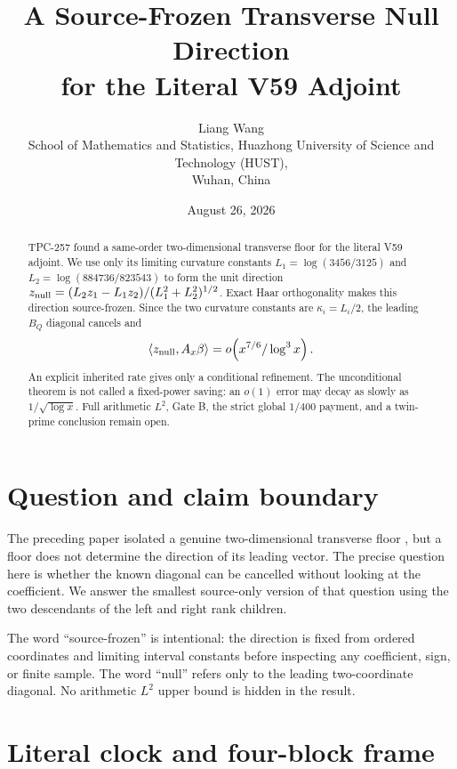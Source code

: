 \documentclass[10pt]{article}
\title{A Source-Frozen Transverse Null Direction\\
for the Literal V59 Adjoint}
\author{Liang Wang\\
\small School of Mathematics and Statistics, Huazhong University of Science and Technology (HUST),\\
\small Wuhan, China}
\date{August 26, 2026}
\begin{document}
\maketitle

\begin{abstract}
TPC-257 found a same-order two-dimensional transverse floor for the literal
V59 adjoint.  We use only its limiting curvature constants
\(L_1=\log(3456/3125)\) and \(L_2=\log(884736/823543)\) to form the unit
direction \(z_{\rm null}=(L_2z_1-L_1z_2)/(L_1^2+L_2^2)^{1/2}\).  Exact Haar
orthogonality makes this direction source-frozen.  Since the two curvature
constants are \(\kappa_i=L_i/2\), the leading \(B_Q\) diagonal cancels and
\[
 \langle z_{\rm null},A_x\beta\rangle
 =o\!\left(x^{7/6}/\log^3x\right).
\]
An explicit inherited rate gives only a conditional refinement.  The
unconditional theorem is not called a fixed-power saving: an \(o(1)\) error
may decay as slowly as \(1/\sqrt{\log x}\).  Full arithmetic \(L^2\), Gate B,
the strict global \(1/400\) payment, and a twin-prime conclusion remain open.
\end{abstract}

\section{Question and claim boundary}

The preceding paper isolated a genuine two-dimensional transverse floor
\cite{tpc257},
but a floor does not determine the direction of its leading vector.  The
precise question here is whether the known diagonal can be cancelled without
looking at the coefficient.  We answer the smallest source-only version of
that question using the two descendants of the left and right rank children.

The word ``source-frozen'' is intentional: the direction is fixed from
ordered coordinates and limiting interval constants before inspecting any
coefficient, sign, or finite sample.  The word ``null'' refers only to the
leading two-coordinate diagonal.  No arithmetic \(L^2\) upper bound is hidden
in the result.

\section{Literal clock and four-block frame}
\end{document}
